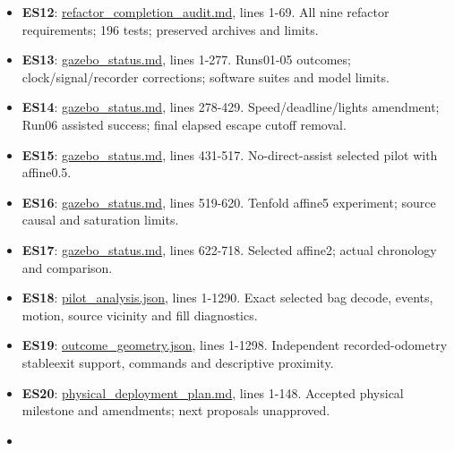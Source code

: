 \documentclass[
  10pt,
  letterpaper,
]{article}
\begin{document}
\begin{itemize}
  \textbf{ES11}:
  \href{/home/mattb/dsim-lab/docs/codex/gesc_gaussian/v3/refactor_plan.md:1}{refactor\_plan.md},
  lines 1-85. Accepted refactor topology, semantics and milestone
  authority.
\item
  \textbf{ES12}:
  \href{/home/mattb/dsim-lab/docs/codex/gesc_gaussian/v3/refactor_completion_audit.md:1}{refactor\_completion\_audit.md},
  lines 1-69. All nine refactor requirements; 196 tests; preserved
  archives and limits.
\item
  \textbf{ES13}:
  \href{/home/mattb/dsim-lab/docs/codex/gesc_gaussian/v3/gazebo_status.md:1}{gazebo\_status.md},
  lines 1-277. Runs01-05 outcomes; clock/signal/recorder corrections;
  software suites and model limits.
\item
  \textbf{ES14}:
  \href{/home/mattb/dsim-lab/docs/codex/gesc_gaussian/v3/gazebo_status.md:278}{gazebo\_status.md},
  lines 278-429. Speed/deadline/lights amendment; Run06 assisted
  success; final elapsed escape cutoff removal.
\item
  \textbf{ES15}:
  \href{/home/mattb/dsim-lab/docs/codex/gesc_gaussian/v3/gazebo_status.md:431}{gazebo\_status.md},
  lines 431-517. No-direct-assist selected pilot with affine0.5.
\item
  \textbf{ES16}:
  \href{/home/mattb/dsim-lab/docs/codex/gesc_gaussian/v3/gazebo_status.md:519}{gazebo\_status.md},
  lines 519-620. Tenfold affine5 experiment; source causal and
  saturation limits.
\item
  \textbf{ES17}:
  \href{/home/mattb/dsim-lab/docs/codex/gesc_gaussian/v3/gazebo_status.md:622}{gazebo\_status.md},
  lines 622-718. Selected affine2; actual chronology and comparison.
\item
  \textbf{ES18}:
  \href{/home/mattb/Experiments/GESC-Gaussian/v3/affine_2_20260929T013558Z/pilot_analysis.json:1}{pilot\_analysis.json},
  lines 1-1290. Exact selected bag decode, events, motion, source
  vicinity and fill diagnostics.
\item
  \textbf{ES19}:
  \href{/home/mattb/Experiments/GESC-Gaussian/v3/affine_2_20260929T013558Z/outcome_geometry.json:1}{outcome\_geometry.json},
  lines 1-1298. Independent recorded-odometry stableexit support,
  commands and descriptive proximity.
\item
  \textbf{ES20}:
  \href{/home/mattb/dsim-lab/docs/codex/gesc_gaussian/v3/physical_deployment_plan.md:1}{physical\_deployment\_plan.md},
  lines 1-148. Accepted physical milestone and amendments; next
  proposals unapproved.
\item

\end{itemize}
\end{document}
